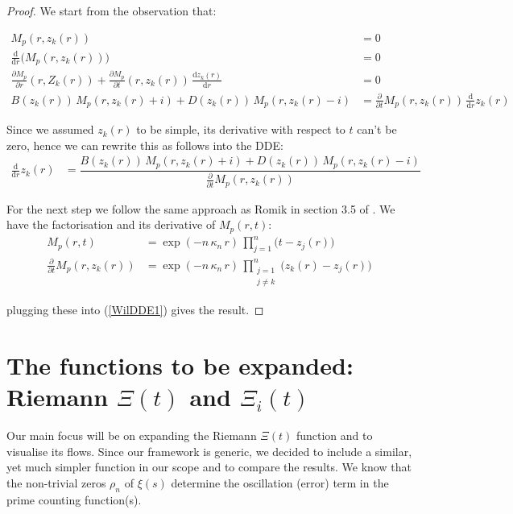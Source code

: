 \documentclass[a4paper,11pt,twoside]{amsart}
\newcommand{\verifiedeq}{=}
\newcommand{\verifiedeq}{\stackrel{\checkmark}{=}}
\begin{document}
\begin{proof}
We start from the observation that:

\begin{align}
M_p(r,z_k(r)) &\verifiedeq 0 \\
\frac{\mathrm{d}}{\mathrm{d} r} \big(M_p(r,z_k(r))\big) &\verifiedeq 0 \\
\frac{\partial M_p}{\partial r}(r,Z_k(r))+ \frac{\partial M_p}{\partial t}(r,z_k(r))\,\frac{\mathrm{d} z_k(r)}{\mathrm{d} r} &\verifiedeq 0 \\
B(z_k(r))\,M_p(r,z_k(r)+i) + D(z_k(r))\,M_p(r,z_k(r)-i)  &\verifiedeq \frac{\partial}{\partial t}M_p(r,z_k(r))\,\frac{\mathrm{d}}{\mathrm{d} r}z_k(r)
\end{align}

Since we assumed $z_k(r)$ to be simple, its derivative with respect to $t$ can't be zero, hence we can rewrite this as follows into the DDE:
\begin{align} \label{WilDDE1}
\frac{\mathrm{d} }{\mathrm{d} r}z_k(r) &\verifiedeq \dfrac{B(z_k(r))\,M_p(r,z_k(r)+i) + D(z_k(r))\,M_p(r,z_k(r)-i)}{ \frac{\partial}{\partial t}M_p(r,z_k(r))}
\end{align}

For the next step we follow the same approach as Romik in section 3.5 of \cite{rom}. We have the factorisation and its derivative of $M_p(r,t)$: 
\begin{align}
M_p(r,t) &\verifiedeq \exp(-n\,\kappa_n\,r)\,\prod_{j=1}^n\bigg(t-z_j(r)\bigg)\\
\frac{\partial}{\partial t} M_p(r,z_k(r)) &\verifiedeq \exp\left(-n\,\kappa_n\,r\right)\,\prod^n_{\substack{j=1\\j\ne k}}\bigg(z_k(r)-z_j(r)\bigg)
\end{align}

plugging these into (\ref{WilDDE1}) gives the result.
\end{proof}
\pagebreak
\section{The functions to be expanded: Riemann $\Xi(t)$ and $\Xi_i(t)$} \label{functobexpanded}
Our main focus will be on expanding the Riemann $\Xi(t)$ function and to visualise its flows. Since our framework is generic, we decided to include a similar, yet much simpler function in our scope and to compare the results. We know that the non-trivial zeros $\rho_n$ of $\xi(s)$ determine the oscillation (error) term in the prime counting function(s). 
\end{document}
